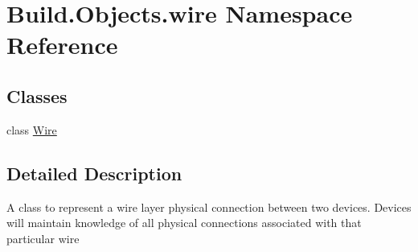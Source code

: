 \hypertarget{namespace_build_1_1_objects_1_1wire}{}\section{Build.\+Objects.\+wire Namespace Reference}
\label{namespace_build_1_1_objects_1_1wire}
\subsection*{Classes}
\begin{DoxyCompactItemize}
\item 
class \hyperlink{class_build_1_1_objects_1_1wire_1_1_wire}{Wire}
\end{DoxyCompactItemize}


\subsection{Detailed Description}
\begin{DoxyVerb}A class to represent a wire layer physical connection between two devices.
Devices will maintain knowledge of all physical connections associated with that particular wire \end{DoxyVerb}
 